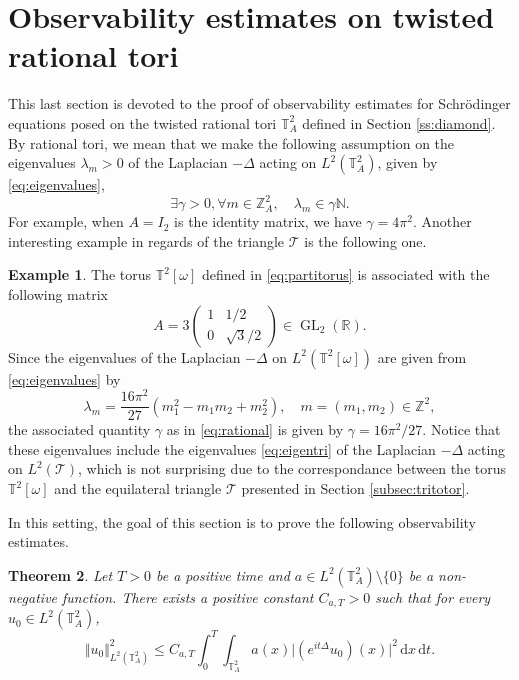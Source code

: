 \documentclass[a4paper,11pt]{amsart}
\numberwithin{equation}{section}
\newtheorem{thm}{Theorem}[section]
\theoremstyle{definition}
\newtheorem{ex}[thm]{Example}
\DeclareMathOperator{\GL}{GL}
\newcommand{\twotorus}{\mathbb T^2_A}
\begin{document}
\section{Observability estimates on twisted rational tori}\label{sec:obstori}

This last section is devoted to the proof of observability estimates for Schr\"odinger equations posed on the twisted rational tori $\twotorus$ defined in Section \ref{ss:diamond}. By rational tori, we mean that we make the following assumption on the eigenvalues $\lambda_m>0$ of the Laplacian $-\Delta$ acting on $L^2(\twotorus)$, given by \eqref{eq:eigenvalues},
\begin{equation}\label{eq:rational}
    \exists\gamma>0, \forall m\in\mathbb Z^2_A,\quad \lambda_m\in\gamma\mathbb N.
\end{equation}
For example, when $A = I_2$ is the identity matrix, we have $\gamma = 4\pi^2$. Another interesting example in regards of the triangle $\mathcal T$ is the following one.

\begin{ex}\label{ex:mattorus} The torus $\mathbb T^2[\omega]$ defined in \eqref{eq:partitorus} is associated with the following matrix
\[
    A = 3\begin{pmatrix}
        1 & 1/2 \\[5pt]
        0 & \sqrt{3}/{2}
    \end{pmatrix}\in\GL_2(\mathbb R).
\]
Since the eigenvalues of the Laplacian $-\Delta$ on $L^2(\mathbb T^2[\omega])$ are given from \eqref{eq:eigenvalues} by
\[
    \lambda_m = \frac{16\pi^2}{27}(m_1^2 - m_1m_2 + m_2^2),\quad m = (m_1,m_2)\in\mathbb Z^2,
\]
the associated quantity $\gamma$ as in \eqref{eq:rational} is given by $\gamma = 16\pi^2/27$. Notice that these eigenvalues include the eigenvalues \eqref{eq:eigentri} of the Laplacian $-\Delta$ acting on $L^2(\mathcal T)$, which is not surprising due to the correspondance between the torus $\mathbb T^2[\omega]$ and the equilateral triangle $\mathcal T$ presented in Section \ref{subsec:tritotor}.
\end{ex}

In this setting, the goal of this section is to prove the following observability estimates.

\begin{thm}\label{thm:obs} Let $T>0$ be a positive time and $a\in L^2(\twotorus)\setminus\{0\}$ be a non-negative function. There exists a positive constant $C_{a,T}>0$ such that for every $u_0\in L^2(\twotorus)$,
\[
	\Vert u_0\Vert^2_{L^2(\twotorus)}\le C_{a,T}\int_0^T\int_{\twotorus}a(x)\big\vert(e^{it\Delta}u_0)(x)\big\vert^2\,\mathrm dx\,\mathrm dt.
\]
\end{thm}
\end{document}
